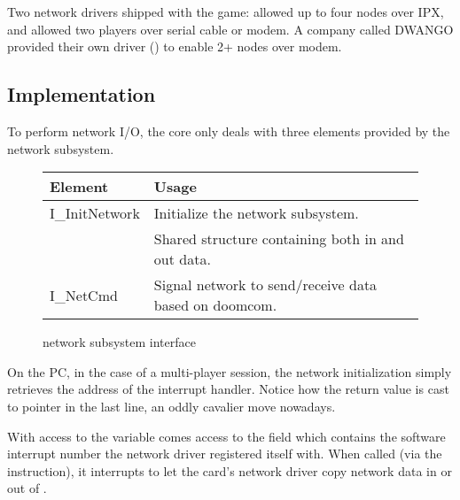 Two network drivers shipped with the game:  allowed up to four nodes over IPX, and  allowed two players over serial cable or modem. A company called DWANGO provided their own driver () to enable 2+ nodes over modem.





\vspace{-5pt}
\subsection{Implementation}
To perform network I/O, the core only deals with three elements provided by the network subsystem.\\
\par
 \begin{figure}[H]
\centering  
\begin{tabularx}{\textwidth}{ L{0.6}  L{1.4}}
  \toprule
  \textbf{Element} &  \textbf{Usage}\\

  \toprule 
   I\_InitNetwork & Initialize the network subsystem.\\
    & Shared structure containing both in and out data.\\
   I\_NetCmd & Signal network to send/receive data based on doomcom.\\
   \toprule
\end{tabularx}
\caption{\doom{} network subsystem interface}
\end{figure}


\vspace{-10pt}
On the PC, in the case of a multi-player session, the network initialization simply retrieves the address of the interrupt handler. Notice how the  return value is cast to pointer in the last line, an oddly cavalier move nowadays.\\
\par











With access to the  variable comes access to the field  which contains the software interrupt number the \doom{} network driver registered itself with. When called (via the  instruction), it interrupts \doom{} to let the card's network driver copy network data in or out of .\\



